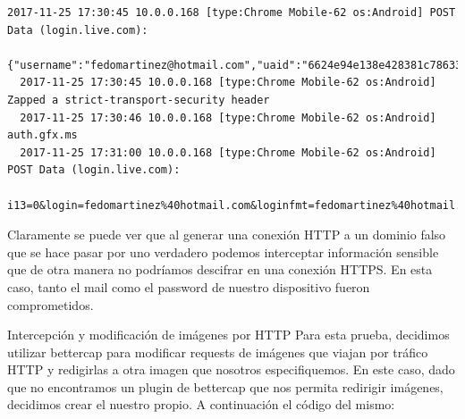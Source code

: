 \begin{lstlisting}[style=base]
  2017-11-25 17:30:45 10.0.0.168 [type:Chrome Mobile-62 os:Android] POST Data (login.live.com):
  {"username":"fedomartinez@hotmail.com","uaid":"6624e94e138e428381c78633a1ab0e74","isOtherIdpSupported":false,"checkPhones":false,"isRemoteNGCSupported":true,"isCookieBannerShown":false,"isFidoSupported":false,"flowToken":"DQhHzeNTqKgxInlQhD31Nw0SsDGg7fJHgiMMlRv1h0E1CW!Aa4LxVqOMMnjVW6PLiF9GhG!OiSWI3hmjm7sieMn2*AysxGtCrV*OFOjsCncmhYVa*OLGWxKpw6wat5kyAk56pUr8xE*ac82nr6IWxvZ0XEIOqIHPMedKY2R2J*R47bzX34e7DNlSj1*lIXI6kAai7ZTgChw7YBHUQMyi!4cQTKAlGLTo28D*FPygvU!EG0OSa*mPnRxBol1fRmNZ3s5Unh2dDJgoQzFwDnSDswE$"}
  2017-11-25 17:30:45 10.0.0.168 [type:Chrome Mobile-62 os:Android] Zapped a strict-transport-security header
  2017-11-25 17:30:46 10.0.0.168 [type:Chrome Mobile-62 os:Android] auth.gfx.ms
  2017-11-25 17:31:00 10.0.0.168 [type:Chrome Mobile-62 os:Android] POST Data (login.live.com):
  i13=0&login=fedomartinez%40hotmail.com&loginfmt=fedomartinez%40hotmail.com&type=11&LoginOptions=3&lrt=&lrtPartition=&hisRegion=&hisScaleUnit=&passwd=prueba&ps=2&psRNGCDefaultType=&psRNGCEntropy=&psRNGCSLK=&psFidoAllowList=&canary=&ctx=&PPFT=DQhHzeNTqKgxInlQhD31Nw0SsDGg7fJHgiMMlRv1h0E1CW%21Aa4LxVqOMMnjVW6PLiF9GhG%21OiSWI3hmjm7sieMn2*AysxGtCrV*OFOjsCncmhYVa*OLGWxKpw6wat5kyAk56pUr8xE*ac82nr6IWxvZ0XEIOqIHPMedKY2R2J*R47bzX34e7DNlSj1*lIXI6kAai7ZTgChw7YBHUQMyi%214cQTKAlGLTo28D*FPygvU%21EG0OSa*mPnRxBol1fRmNZ3s5Unh2dDJgoQzFwDnSDswE%24&PPSX=Pa&NewUser=1&FoundMSAs=&fspost=0&i21=0&CookieDisclosure=0&i2=36&i17=0&i18=__ConvergedLoginPaginatedStrings%7C1%2C__ConvergedLogin_PCore%7C1%2C&i19=71540
\end{lstlisting}

Claramente se puede ver que al generar una conexión HTTP a un dominio falso que se hace pasar por uno verdadero podemos interceptar información sensible que de otra manera no podríamos descifrar en una conexión HTTPS. En esta caso, tanto el mail como el password de nuestro dispositivo fueron comprometidos.

Intercepción y modificación de imágenes por HTTP
Para esta prueba, decidimos utilizar bettercap para modificar requests de imágenes que viajan por tráfico HTTP y redigirlas a otra imagen que nosotros especifiquemos. En este caso, dado que no encontramos un plugin de bettercap que nos permita redirigir imágenes, decidimos crear el nuestro propio. A continuación el código del mismo:


